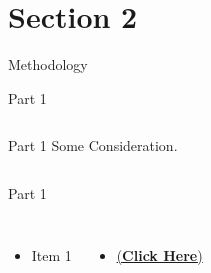 \documentclass[usenames,dvipsnames,aspectratio=169]{beamer}
\begin{document}
\section{Section 2}
\begin{frame}{Methodology}

\vspace*{-0.38cm}
\hspace*{-0.625cm}
\methodologyFig

\end{frame}
\begin{frame}{Part 1}
\label{P1}

\vspace*{-1.00cm}
\begin{columns}[t]
        \methodologyFig
    
    
        \begin{block}{Part 1}
        \small{
            Some Consideration.
        }
        \end{block}
    
    
\end{columns}

\end{frame}
\begin{frame}{Part 1}
\label{part1}

\vspace*{-1.00cm}
\begin{columns}[t]
        \methodologyFig
    
    
        \begin{itemize}
            \item Item 1
        \end{itemize}
        
        \begin{itemize}
            \item \hyperlink{methodology1:mapping}{(\textbf{Click Here})}
        \end{itemize}
        
\end{columns}

\end{frame}
\end{document}
